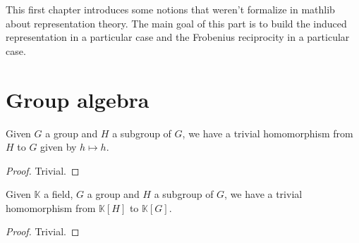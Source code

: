 This first chapter introduces some notions that weren't formalize in
mathlib about representation theory. The main goal of this part is to build
the induced representation in a particular case and the Frobenius reciprocity
in a particular case.

\section{Group algebra}

\begin{definition}
    \label{def:trivialHG}
    \uses{}
    \leanok
    Given $G$ a group and $H$ a subgroup of $G$, we have a trivial homomorphism from $H$
    to $G$ given by $h\mapsto h$.
    \begin{proof}
        \leanok
        Trivial.
    \end{proof}
\end{definition}

\begin{definition}
    \label{def:trivialkHkG}
    \uses{}
    \leanok
    Given $\mathbb{K}$ a field, $G$ a group and $H$ a subgroup of $G$, 
    we have a trivial homomorphism from $\mathbb{K}[H]$ to $\mathbb{K}[G]$.
    \begin{proof}
        \leanok
        Trivial.
    \end{proof}
\end{definition}